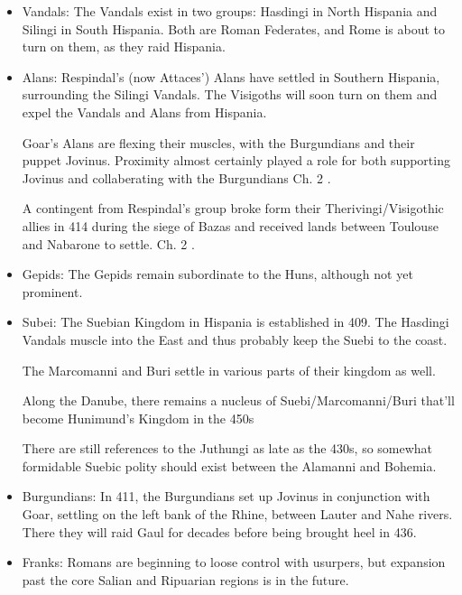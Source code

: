 \documentclass{article}
\newcommand{\specificCite}[1]{\tiny #1 \normalsize}
\begin{document}
\begin{itemize}
		\item Vandals:\newline
		The Vandals exist in two groups:  Hasdingi in North Hispania and Silingi in South Hispania.
		Both are Roman Federates, and Rome is about to turn on them, as they raid Hispania.
		
		\item Alans:\newline
		Respindal's (now Attaces') Alans have settled in Southern Hispania, surrounding the Silingi Vandals.
		The Visigoths will soon turn on them and expel the Vandals and Alans from Hispania.
		
		Goar's Alans are flexing their muscles, with the Burgundians and their puppet Jovinus.
		Proximity almost certainly played a role for both supporting Jovinus and collaberating with the Burgundians \cite{BachrachAlans}\specificCite{Ch. 2}.
		
		A contingent from Respindal's group broke form their Therivingi/Visigothic allies in 414 during the siege of Bazas and received lands between Toulouse and Nabarone to settle. \cite{BachrachAlans}\specificCite{Ch. 2}.
		
		\item Gepids:\newline
		The Gepids remain subordinate to the Huns, although not yet prominent.
		
		\item Subei:\newline
		The Suebian Kingdom in Hispania is established in 409.
		The Hasdingi Vandals muscle into the East and thus probably keep the Suebi to the coast.
		
		The Marcomanni and Buri settle in various parts of their kingdom as well.
		
		Along the Danube, there remains a nucleus of Suebi/Marcomanni/Buri that'll become Hunimund's Kingdom in the 450s \cite{PLRE_Vol2}
		
		There are still references to the Juthungi as late as the 430s, so somewhat formidable Suebic polity should exist between the Alamanni and Bohemia.
		
		\item Burgundians:\newline
		In 411, the Burgundians set up Jovinus in conjunction with Goar, settling on the left bank of the Rhine, between Lauter and Nahe rivers.
		There they will raid Gaul for decades before being brought heel in 436.
		
		\item Franks:\newline
		Romans are beginning to loose control with usurpers, but expansion past the core Salian and Ripuarian regions is in the future.
		

\end{itemize}
\end{document}
